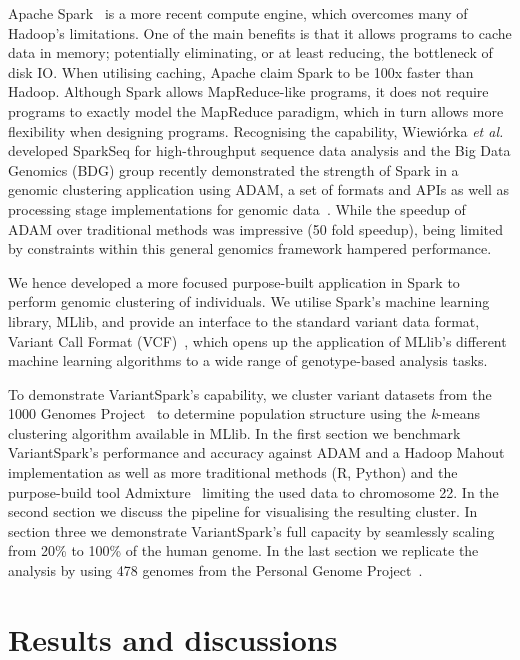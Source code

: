 \documentclass{bmcart}
\newcommand{\variantSpark}{{\sc VariantSpark}}
\newcommand{\kMeans}{\textit{k}-means}
\begin{document}
{\sc Apache Spark}~\cite{Zaharia2011} is a more recent compute engine, which overcomes many of Hadoop's limitations. 
One of the main benefits is that it allows programs to cache data in memory; potentially eliminating, or at least reducing, the bottleneck of disk IO. 
When utilising caching, Apache claim {\sc Spark} to be 100x faster than Hadoop. 
Although {\sc Spark} allows MapReduce-like programs, it does not require programs to exactly model the MapReduce paradigm, which in turn allows more flexibility when designing programs. 
Recognising the capability, Wiewi{\'o}rka {\it et al.}~\cite{Wiewiorka2014} developed SparkSeq for high-throughput sequence data analysis and the Big Data Genomics (BDG) group recently demonstrated the strength of {\sc Spark} in a genomic clustering application using {\sc ADAM}, a set of formats and APIs as well as processing stage implementations for genomic data~\cite{Massie2013}. 
While the speedup of {\sc ADAM} over traditional methods was impressive (50 fold speedup), being limited by constraints within this general genomics framework hampered performance. 

We hence developed a more focused purpose-built application in {\sc Spark} to perform genomic clustering of individuals. 
We utilise {\sc Spark}'s machine learning library, \mbox{MLlib}, and provide an interface to the standard variant data format, Variant Call Format (VCF)~\cite{1KG2012}, which opens up the application of MLlib's different machine learning algorithms to a wide range of genotype-based analysis tasks. 

To demonstrate \variantSpark's capability, we cluster variant datasets from the 1000 Genomes Project~\cite{1KG2012} to determine population structure using the \kMeans{} clustering algorithm available in MLlib. 
In the first section we benchmark \variantSpark's performance and accuracy against {\sc ADAM} and a Hadoop Mahout implementation as well as more traditional methods (R, Python) and the purpose-build tool {\sc Admixture}~\cite{Alexander2009} limiting the used data to chromosome 22.
In the second section we discuss the pipeline for visualising the resulting cluster.
In section three we demonstrate \variantSpark's full capacity by seamlessly scaling from 20\% to 100\% of the human genome.
In the last section we replicate the analysis by using 478 genomes from the Personal Genome Project~\cite{Lunshof2013}.


\section*{Results and discussions}
\end{document}
